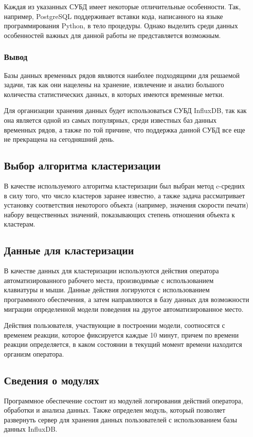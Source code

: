 Каждая из указанных СУБД имеет некоторые отличительные особенности. Так, например, PostgreSQL поддерживает вставки кода, написанного на языке программирования Python, в тело процедуры. Однако выделить среди данных особенностей важных для данной работы не представляется возможным.

\subsubsection*{Вывод}
Базы данных временных рядов являются наиболее подходящими для решаемой задачи, так как они нацелены на хранение, извлечение и анализ большого количества статистических данных, в которых имеются временные метки.

Для организации хранения данных будет использоваться СУБД InfluxDB, так как она является одной из самых популярных, среди известных баз данных временных рядов, а также по той причине, что поддержка данной СУБД все еще не прекращена на сегодняшний день.

\subsection{Выбор алгоритма кластеризации}
В качестве используемого алгоритма кластеризации был выбран метод c-средних в силу того, что число кластеров заранее известно, а также задача рассматривает установку соответствия некоторого объекта (например, значения скорости печати) набору вещественных значений, показывающих степень отношения объекта к кластерам.

\subsection{Данные для кластеризации}
В качестве данных для кластеризации используются действия оператора автоматизированного рабочего места, производимые с использованием клавиатуры и мыши. Данные действия логируются с использованием программного обеспечения, а затем направляются в базу данных для возможности миграции определенной модели поведения на другое автоматизированное место.

Действия пользователя, участвующие в построении модели, соотносятся с временем реакции, которое фиксируется каждые 10 минут, причем по времени реакции определяется, в каком состоянии в текущий момент времени находится организм оператора.

\subsection{Сведения о модулях}
Программное обеспечение состоит из модулей логирования действий \newline оператора, обработки и анализа данных. Также определен модуль, который позволяет развернуть сервер для хранения данных пользователей с использованием базы данных InfluxDB.

